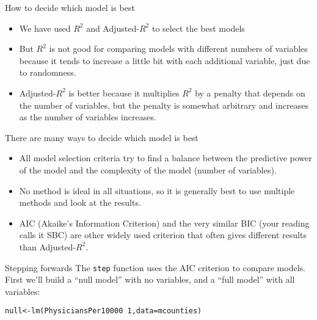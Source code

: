 \documentclass{beamer}\usepackage[]{graphicx}\usepackage[]{color}
\makeatletter
\newcommand{\hlnum}[1]{\textcolor[rgb]{0.824,0.412,0.118}{#1}}%
\newcommand{\hlopt}[1]{\textcolor[rgb]{1,0.894,0.769}{#1}}%
\newcommand{\hlstd}[1]{\textcolor[rgb]{1,0.894,0.769}{#1}}%
\newcommand{\hlkwb}[1]{\textcolor[rgb]{0.804,0.776,0.451}{#1}}%
\newcommand{\hlkwc}[1]{\textcolor[rgb]{0.78,0.941,0.545}{#1}}%
\newcommand{\hlkwd}[1]{\textcolor[rgb]{1,0.78,0.769}{#1}}%
\newenvironment{kframe}{%
 \def\at@end@of@kframe{}%
 \ifinner\ifhmode%
  \def\at@end@of@kframe{\end{minipage}}%
  \begin{minipage}{\columnwidth}%
 \fi\fi%
 \def\FrameCommand##1{\hskip\@totalleftmargin \hskip-\fboxsep
 \colorbox{shadecolor}{##1}\hskip-\fboxsep
     \hskip-\linewidth \hskip-\@totalleftmargin \hskip\columnwidth}%
 \MakeFramed {\advance\hsize-\width
   \@totalleftmargin\z@ \linewidth\hsize
   \@setminipage}}%
 {\par\unskip\endMakeFramed%
 \at@end@of@kframe}
\newenvironment{knitrout}{}{} %
\makeatother
\begin{document}
\begin{darkframes}
    \begin{frame}[fragile]{How to decide which model is best}
      \begin{itemize}[<+->]
        \item We have used $R^2$ and Adjusted-$R^2$ to select the best models
        \item But $R^2$ is not good for comparing models with different numbers of variables because it tends to increase a little bit with each additional variable, just due to randomness.
        \item Adjusted-$R^2$ is better because it multiplies $R^2$ by a penalty that depends on the number of variables, but the penalty is somewhat arbitrary and increases as the number of variables increases.
      \end{itemize} 
    \end{frame}


    \begin{frame}[fragile]{There are many ways to decide which model is best}
      \begin{itemize}[<+->]
        \item All model selection criteria try to find a balance between the \alert{predictive power of the model} and the \alert{complexity of the model} (number of variables).
        \item No method is ideal in all situations, so it is generally best to use multiple methods and look at the results.
        \item AIC (Akaike’s Information Criterion) and the very similar BIC (your reading calls it SBC) are other widely used criterion that often gives different results than Adjusted-$R^2$.
      \end{itemize} 

      \lc  
    \end{frame}  

    \begin{frame}[fragile]{Stepping forwards}
       The \texttt{step} function uses the AIC criterion to compare models. First we'll build a ``null model'' with no variables, and a ``full model'' with all variables:

      \fontsize{9}{9}\selectfont
\begin{knitrout}
\begin{kframe}
\begin{alltt}
\hlstd{null} \hlkwb{<-} \hlkwd{lm}\hlstd{(PhysiciansPer10000} \hlopt{~} \hlnum{1}\hlstd{,} \hlkwc{data}\hlstd{=mcounties)}


\end{alltt}
\end{kframe}
\end{knitrout}
\end{frame}
\end{darkframes}
\end{document}
